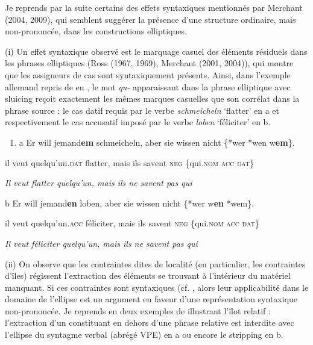 Je reprends par la suite certains des effets syntaxiques mentionnés par Merchant (2004, 2009), qui semblent suggérer la présence d'une structure ordinaire, mais non-prononcée, dans les constructions elliptiques.

(i) Un effet syntaxique observé est le marquage casuel des éléments résiduels dans les phrases elliptiques (Ross (1967, 1969), Merchant (2001, 2004)), qui montre que les assigneurs de cas sont syntaxiquement présents. Ainsi, dans l'exemple allemand repris de \citet{Ross1969} en , le mot \textit{qu-} apparaissant dans la phrase elliptique avec sluicing reçoit exactement les mêmes marques casuelles que son corrélat dans la phrase source : le cas datif requis par le verbe \textit{schmeicheln} `flatter' en a et respectivement le cas accusatif imposé par le verbe \textit{loben} `féliciter' en b. 


\begin{enumerate}
\item \label{bkm:Ref305744740}a  Er  will  jemand\textbf{em}  schmeicheln,  aber  sie  wissen  nicht  \{*wer {\textbar} *wen {\textbar} w\textbf{em}\}.


\end{enumerate}
  il  veut  quelqu'un.\textsc{dat}  flatter,  mais  ils  savent  \textsc{neg}  \{qui.\textsc{nom} {\textbar} \textsc{acc {\textbar} dat\}}

\textit{  Il veut flatter quelqu'un, mais ils ne savent pas qui}  

  b  Er  will  jemand\textbf{en}  loben,  aber  sie  wissen  nicht  \{*wer  {\textbar} w\textbf{en}  {\textbar} *wem\}.

    il  veut  quelqu'un.\textsc{acc}  féliciter,  mais  ils  savent  \textsc{neg}  \{qui.\textsc{nom}  {\textbar} \textsc{acc  {\textbar} dat\}}

    \textit{Il veut féliciter quelqu'un, mais ils ne savent pas qui}

(ii) On observe que les contraintes dites de localité (en particulier, les contraintes d'îles) régissent l'extraction des éléments se trouvant à l'intérieur du matériel manquant. Si ces contraintes sont syntaxiques (cf. \citet{Sag1976}, alors leur applicabilité dans le domaine de l'ellipse est un argument en faveur d'une représentation syntaxique non-prononcée. Je reprends en  deux exemples de \citet{Merchant2009} illustrant l'îlot relatif : l'extraction d'un constituant en dehors d'une phrase relative est interdite avec l'ellipse du syntagme verbal (abrégé VPE) en a ou encore le stripping en b.



